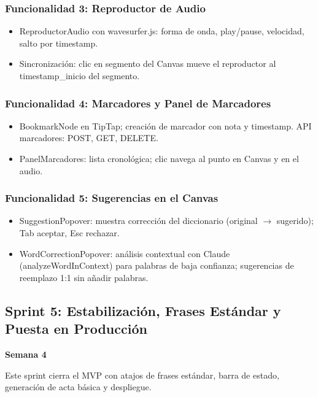 \documentclass[12pt,a4paper]{report}
\begin{document}
\subsubsection{Funcionalidad 3: Reproductor de Audio}

\begin{itemize}
    \item ReproductorAudio con wavesurfer.js: forma de onda, play/pause, velocidad, salto por timestamp.
    \item Sincronización: clic en segmento del Canvas mueve el reproductor al timestamp\_inicio del segmento.
\end{itemize}

\subsubsection{Funcionalidad 4: Marcadores y Panel de Marcadores}

\begin{itemize}
    \item BookmarkNode en TipTap; creación de marcador con nota y timestamp. API marcadores: POST, GET, DELETE.
    \item PanelMarcadores: lista cronológica; clic navega al punto en Canvas y en el audio.
\end{itemize}

\subsubsection{Funcionalidad 5: Sugerencias en el Canvas}

\begin{itemize}
    \item SuggestionPopover: muestra corrección del diccionario (original $\to$ sugerido); Tab aceptar, Esc rechazar.
    \item WordCorrectionPopover: análisis contextual con Claude (analyzeWordInContext) para palabras de baja confianza; sugerencias de reemplazo 1:1 sin añadir palabras.
\end{itemize}

\subsection{Sprint 5: Estabilización, Frases Estándar y Puesta en Producción}

\textbf{Semana 4}

Este sprint cierra el MVP con atajos de frases estándar, barra de estado, generación de acta básica y despliegue.
\end{document}
